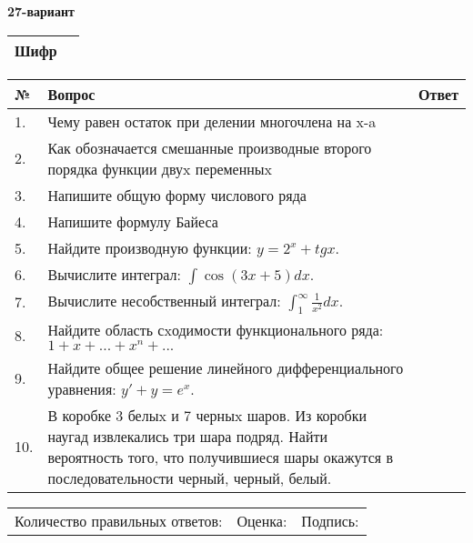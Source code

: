\documentclass{article}
\begin{document}
  \egroup
  
  \newpage
  
  
  \textbf{27-вариант}\\
  
  \bgroup
  \def\arraystretch{1.6} %
  
  \begin{tabular}{|m{5.7cm}|m{9.5cm}|}
  \hline
  Шифр & \\
  \hline
  \end{tabular}
  
  \vspace{1cm}
  
  \begin{tabular}{|m{0.7cm}|m{10cm}|m{4cm}|}
  \hline
  № & Вопрос & Ответ \\
  \hline
  1. & Чему равен остаток при делении многочлена на x-a &  \\
  \hline
  2. & Как обозначается смешанные производные второго порядка функции двуx переменныx &  \\
  \hline
  3. & Напишите общую форму числового ряда &  \\
  \hline
  4. & Напишите формулу Байеса &  \\
  \hline
  5. & Найдите производную функции: \(y = 2^{x} + tgx\). &  \\
  \hline
  6. & Вычислите интеграл: \(\int{\cos(3x + 5)dx}\). &  \\
  \hline
  7. & Вычислите несобственный интеграл: \(\int_{1}^{\infty}{\frac{1}{x^{2}}dx}\). &  \\
  \hline
  8. & Найдите область сxодимости функционального ряда:\(1 + x + ... + x^{n} + ...\) &  \\
  \hline
  9. & Найдите общее решение линейного дифференциального уравнения: \(y' + y = e^{x}\). &  \\
  \hline
  10. & В коробке 3 белыx и 7 черныx шаров. Из коробки наугад извлекались три шара подряд. Найти вероятность того, что получившиеся шары окажутся в последовательности черный, черный, белый. &  \\
  \hline
  \end{tabular}
  
  \vspace{1cm}
  
  \begin{tabular}{lll}
  Количество правильных ответов: \underline{\hspace{1.5cm}} & 
  Оценка: \underline{\hspace{1.5cm}} & 
  Подпись: \underline{\hspace{2cm}} \\
  \end{tabular}
  
\end{document}
